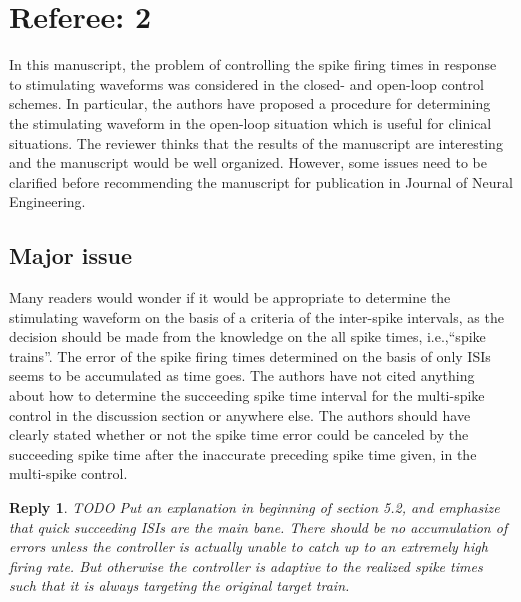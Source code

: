 \documentclass{article}
\newtheorem*{rep}{Reply}
\begin{document}
\clearpage
\section{Referee: 2}

In this manuscript, the problem of controlling the spike firing times in
response to stimulating waveforms was considered in the closed- and open-loop
control schemes. In particular, the authors have proposed a procedure for
determining the stimulating waveform in the open-loop situation which is useful
for clinical situations. The reviewer thinks that the results of the manuscript
are interesting and the manuscript would be well organized. However, some issues
need to be clarified before recommending the manuscript for publication in
Journal of Neural Engineering.


\subsection{Major issue}
Many readers would wonder if it would be appropriate to determine the
stimulating waveform on the basis of a criteria of the inter-spike intervals, as
the decision should be made from the knowledge on the all spike times,
i.e.,“spike trains”. The error of the spike firing times determined on the basis
of only ISIs seems to be accumulated as time goes. The authors have not cited
anything about how to determine the succeeding spike time interval for the
multi-spike control in the discussion section or anywhere else. The authors
should have clearly stated whether or not the spike time error could be canceled
by the succeeding spike time after the inaccurate preceding spike time given, in
the multi-spike control.
\begin{rep}
TODO
Put an explanation in beginning of section 5.2, and emphasize that quick
succeeding ISIs are the main bane. There should be no accumulation of errors
unless the controller is actually unable to catch up to an extremely high firing rate. 
But otherwise the controller is adaptive to the realized spike times such that
it is always targeting the original target train. 
\end{rep}
\end{document}
